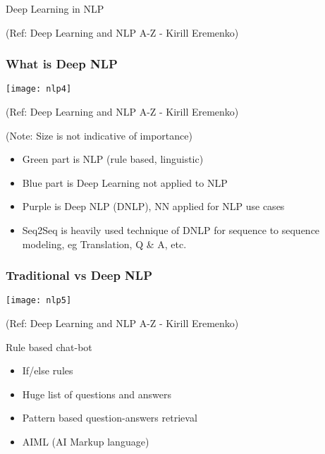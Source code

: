 \begin{frame}[fragile]\frametitle{}
\begin{center}
{\Large Deep Learning in NLP}

\tiny{(Ref: Deep Learning and NLP A-Z - Kirill Eremenko)}
\end{center}
\end{frame}

\begin{frame}[fragile]\frametitle{What is Deep NLP}
\begin{center}
\texttt{[image: nlp4]}

\tiny{(Ref: Deep Learning and NLP A-Z - Kirill Eremenko)}

\tiny{(Note: Size is not indicative of importance)}
\end{center}

	\begin{itemize}
	\item Green part is NLP (rule based, linguistic)
	\item Blue part is Deep Learning not applied to NLP
	\item Purple is Deep NLP (DNLP), NN applied for NLP use cases
	\item Seq2Seq is heavily used technique of DNLP for sequence to sequence modeling, eg Translation, Q \& A, etc.
	\end{itemize}
	

\end{frame}

\begin{frame}[fragile]\frametitle{Traditional vs Deep NLP}
\begin{center}
\texttt{[image: nlp5]}

\tiny{(Ref: Deep Learning and NLP A-Z - Kirill Eremenko)}
\end{center}
 Rule based chat-bot
	\begin{itemize}
	\item If/else rules
	\item Huge list of questions and answers
		\item Pattern based question-answers retrieval
		\item AIML (AI Markup language)
	\end{itemize}
	

\end{frame}

